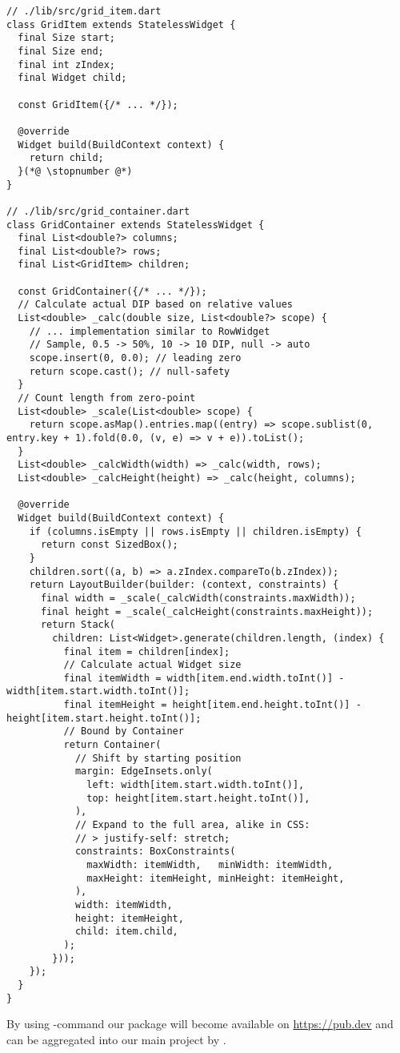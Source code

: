 \begin{lstlisting}
// ./lib/src/grid_item.dart
class GridItem extends StatelessWidget {
  final Size start;
  final Size end;
  final int zIndex;
  final Widget child;

  const GridItem({/* ... */});

  @override
  Widget build(BuildContext context) {
    return child;
  }(*@ \stopnumber @*)
}

// ./lib/src/grid_container.dart
class GridContainer extends StatelessWidget {
  final List<double?> columns;
  final List<double?> rows;
  final List<GridItem> children;

  const GridContainer({/* ... */});
  // Calculate actual DIP based on relative values
  List<double> _calc(double size, List<double?> scope) {
    // ... implementation similar to RowWidget
    // Sample, 0.5 -> 50%, 10 -> 10 DIP, null -> auto
    scope.insert(0, 0.0); // leading zero
    return scope.cast(); // null-safety
  }
  // Count length from zero-point
  List<double> _scale(List<double> scope) {
    return scope.asMap().entries.map((entry) => scope.sublist(0, entry.key + 1).fold(0.0, (v, e) => v + e)).toList();
  }
  List<double> _calcWidth(width) => _calc(width, rows);
  List<double> _calcHeight(height) => _calc(height, columns);

  @override
  Widget build(BuildContext context) {
    if (columns.isEmpty || rows.isEmpty || children.isEmpty) {
      return const SizedBox();
    }
    children.sort((a, b) => a.zIndex.compareTo(b.zIndex));
    return LayoutBuilder(builder: (context, constraints) {
      final width = _scale(_calcWidth(constraints.maxWidth));
      final height = _scale(_calcHeight(constraints.maxHeight));
      return Stack(
        children: List<Widget>.generate(children.length, (index) {
          final item = children[index];
          // Calculate actual Widget size
          final itemWidth = width[item.end.width.toInt()] - width[item.start.width.toInt()];
          final itemHeight = height[item.end.height.toInt()] - height[item.start.height.toInt()];
          // Bound by Container
          return Container(
            // Shift by starting position
            margin: EdgeInsets.only(
              left: width[item.start.width.toInt()],
              top: height[item.start.height.toInt()],
            ),
            // Expand to the full area, alike in CSS:
            // > justify-self: stretch;
            constraints: BoxConstraints(
              maxWidth: itemWidth,   minWidth: itemWidth,
              maxHeight: itemHeight, minHeight: itemHeight,
            ),
            width: itemWidth,
            height: itemHeight,
            child: item.child,
          );
        }));
    });
  }
}
\end{lstlisting}

\noindent By using -command our package will become available on 
\href{https://pub.dev}{https://pub.dev} and can be aggregated into our main project by 
.